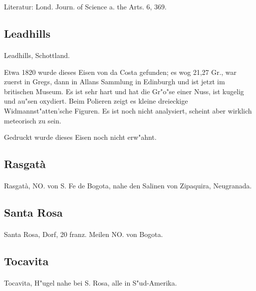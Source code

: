 \documentclass[a4paper, 11pt, oneside]{article}
\begin{document}
Literatur: Lond. Journ. of Science a. the Arts. 6, 369.

\subsection{Leadhills}
\normalsize
\paragraph{}
Leadhills, Schottland.

Etwa 1820 wurde dieses Eisen von da Costa gefunden; es wog 21,27 Gr., war zuerst in Gregs, dann in Allans Sammlung in Edinburgh und ist jetzt im britischen Museum. Es ist sehr hart und hat die Gr"o"se einer Nuss, ist kugelig und au"sen oxydiert. Beim Polieren zeigt es kleine dreieckige Widmannst"atten'sche Figuren. Es ist noch nicht analysiert, scheint aber wirklich meteorisch zu sein.

Gedruckt wurde dieses Eisen noch nicht erw"ahnt.
\subsection{Rasgatà}
\paragraph{}
Rasgatà, NO. von S. Fe de Bogota, nahe den Salinen von Zipaquira, Neugranada.

\subsection{Santa Rosa}
\paragraph{}
Santa Rosa, Dorf, 20 franz. Meilen NO. von Bogota.

\subsection{Tocavita}
\paragraph{}
Tocavita, H"ugel nahe bei S. Rosa, alle in S"ud-Amerika.
\end{document}
